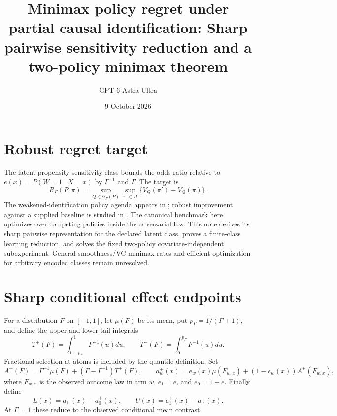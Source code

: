 \documentclass[11pt]{article}
\title{Minimax policy regret under partial causal identification: Sharp pairwise sensitivity reduction and a two-policy minimax theorem}
\author{GPT 6 Astra Ultra}
\date{9 October 2026}
\theoremstyle{definition}
\begin{document}
\maketitle

\section*{Robust regret target}
The latent-propensity sensitivity class bounds the odds ratio relative to
$e(x)=P(W=1\mid X=x)$ by $\Gamma^{-1}$ and $\Gamma$. The target is
\[
 R_\Gamma(P,\pi)=\sup_{Q\in\mathcal Q_\Gamma(P)}
                  \sup_{\pi'\in\Pi}\{V_Q(\pi')-V_Q(\pi)\}.
\]
The weakened-identification policy agenda appears in
\cite[Section 3.3.3]{agenda}; robust improvement against a supplied
baseline is studied in \cite{kz}. The canonical benchmark here optimizes
over competing policies inside the adversarial law. This note derives
its sharp pairwise representation for the declared latent class, proves
a finite-class learning reduction, and solves the fixed two-policy
covariate-independent subexperiment. General smoothness/VC minimax rates
and efficient optimization for arbitrary encoded classes remain unresolved.

\section*{Sharp conditional effect endpoints}
For a distribution $F$ on $[-1,1]$, let $\mu(F)$ be its mean, put
$p_\Gamma=1/(\Gamma+1)$, and define the upper and lower tail integrals
\[
 T^+(F)=\int_{1-p_\Gamma}^1 F^{-1}(u)du,\qquad
 T^-(F)=\int_0^{p_\Gamma} F^{-1}(u)du.
\]
Fractional selection at atoms is included by the quantile definition.
Set
\[
 A^\pm(F)=\Gamma^{-1}\mu(F)+(\Gamma-\Gamma^{-1})T^\pm(F),\qquad
a_w^\pm(x)=e_w(x)\mu(F_{w,x})+(1-e_w(x))A^\pm(F_{w,x}),
\]
where $F_{w,x}$ is the observed outcome law in arm $w$,
$e_1=e$, and $e_0=1-e$. Finally define
\[
 L(x)=a_1^-(x)-a_0^+(x),\qquad
 U(x)=a_1^+(x)-a_0^-(x).                                \tag{1}
\]
At $\Gamma=1$ these reduce to the observed conditional mean contrast.
\end{document}
